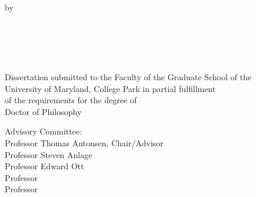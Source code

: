 
\clearpage{}
{}

\thispagestyle{empty}
\hbox{\ }
\vspace{1in}
\renewcommand{\baselinestretch}{1}
\small\normalsize
\begin{center}

\large{{\dissertationtitle}}\\
\ \\
\ \\
\large{by} \\
\ \\%
\large{\myfullname}
\ \\
\ \\
\ \\
\ \\
\normalsize
Dissertation submitted to the Faculty of the Graduate School of the \\
University of Maryland, College Park in partial fulfillment \\
of the requirements for the degree of \\
Doctor of Philosophy \\
\gradyear
\end{center}

\vspace{7.5em}

\noindent Advisory Committee: \\
Professor Thomas Antonsen, Chair/Advisor \\
Professor Steven Anlage \\
Professor Edward Ott \\
Professor \\
Professor \\

